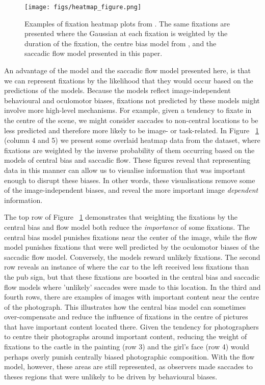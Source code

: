 \begin{figure}
\centering
\texttt{[image: figs/heatmap\_figure.png]}
\caption{Examples of fixation heatmap plots from \cite{clarke2013}. The same fixations are presented where the Gaussian at each fixation is weighted by the duration of the fixation, the centre bias model from \cite{clarke-tatler2014} , and the saccadic flow model presented in this paper.}
\label{fig:adjustedHeatmaps}
\end{figure}

An advantage of the \citet{clarke-tatler2014} model and the saccadic flow model presented here, is that we can represent fixations by the likelihood that they would occur based on the predictions of the models. Because the models reflect image-independent behavioural and oculomotor biases, fixations not predicted by these models might involve more high-level mechanisms. For example, given a tendency to fixate in the centre of the scene, we might consider saccades to non-central locations to be less predicted and therefore more likely to be image- or task-related.  In Figure ~\ref{fig:adjustedHeatmaps} (column 4 and 5) we present some overlaid heatmap data from the \citet{clarke2013} dataset, where fixations are weighted by the inverse probability of them occurring based on the models of central bias and saccadic flow. These figures reveal that representing data in this manner can allow us to visualise information that was important enough to disrupt these biases. In other words, these visualisations  remove some of the image-independent biases, and reveal the more important image \emph{dependent} information.


The top row of Figure ~\ref{fig:adjustedHeatmaps} demonstrates that weighting the fixations by the central bias and flow model both reduce the \emph{importance} of some fixations. The central bias model punishes fixations near the center of the image, while the flow model punishes fixations that were well predicted by the oculomotor biases of the saccadic flow model. Conversely, the models reward unlikely fixations. The second row reveals an instance of where the car to the left received less fixations than the pub sign, but that these fixations are boosted in the central bias and saccadic flow models where 'unlikely' saccades were made to this location. In the third and fourth rows, there are examples of images with important content near the centre of the photograph. This illustrates how the central bias model can sometimes over-compensate and reduce the influence of fixations in the centre of pictures that have important content located there. Given the tendency for photographers to centre their photographs around important content, reducing the weight of fixations to the castle in the painting (row 3) and the girl's face (row 4) would perhaps overly punish centrally biased photographic composition. With the flow model, however, these areas are still represented, as observers made saccades to theses regions that were unlikely to be driven by behavioural biases.

